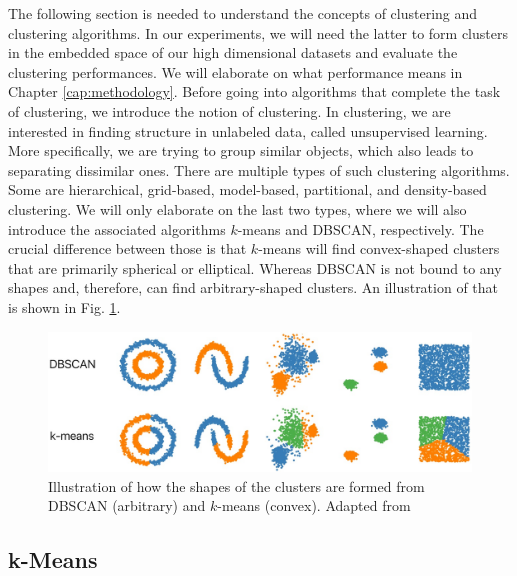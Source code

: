The following section is needed to understand the concepts of clustering and clustering algorithms. In our experiments, we will need the latter to form clusters in the embedded space of our high dimensional datasets and evaluate the clustering performances. We will elaborate on what performance means in Chapter \ref{cap:methodology}. Before going into algorithms that complete the task of clustering, we introduce the notion of clustering. In clustering, we are interested in finding structure in unlabeled data, called unsupervised learning. More specifically, we are trying to group similar objects, which also leads to separating dissimilar ones. There are multiple types of such clustering algorithms. Some are hierarchical, grid-based, model-based, partitional, and density-based clustering. We will only elaborate on the last two types, where we will also introduce the associated algorithms $k$-means and DBSCAN, respectively. The crucial difference between those is that $k$-means will find convex-shaped clusters that are primarily spherical or elliptical. Whereas DBSCAN is not bound to any shapes and, therefore, can find arbitrary-shaped clusters. An illustration of that is shown in Fig. \ref{fig:dbscan_vs_k-means}.
\cite{clustering(1)}
\begin{figure}[!]
	\centering
	\includegraphics[width=1\columnwidth]{images/dbscan_vs_k-means.jpg}
	\caption[DBSCAN vs. $k$-means]{Illustration of how the shapes of the clusters are formed from DBSCAN (arbitrary) and $k$-means (convex). Adapted from \footnotemark}
    \label{fig:dbscan_vs_k-means}
\end{figure}

\subsection{k-Means} \label{k-means}

